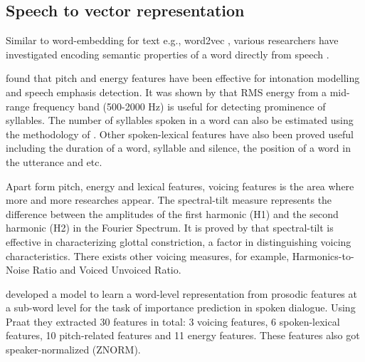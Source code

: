\subsection{Speech to vector representation}
Similar to word-embedding for text e.g., word2vec \citep{Mikolov2013}, various researchers have investigated encoding semantic properties of a word directly from speech \citep{Chung2018}. 

\citet{Brenier2005} found that pitch and energy features have been effective for intonation modelling and speech emphasis detection. It was shown by \citet{Tamburini2003} that RMS energy from a mid-range frequency band (500-2000 Hz) is useful for detecting prominence of syllables. The number of syllables spoken in a word can also be estimated using the methodology of \citet{DeJong2009}. Other spoken-lexical features have also been proved useful including the duration of a word, syllable and silence, the position of a word in the utterance and etc. 

Apart form pitch, energy and lexical features, voicing features is the area where more and more researches appear. The spectral-tilt measure represents the difference between the amplitudes of the first harmonic (H1) and the second harmonic (H2) in the Fourier Spectrum. It is proved by \citet{Keating2006} that spectral-tilt is effective in characterizing glottal constriction, a factor in distinguishing voicing characteristics. There exists other voicing measures, for example, Harmonics-to-Noise Ratio and Voiced Unvoiced Ratio.

\citet{Kafle2019} developed a model to learn a word-level representation from prosodic features at a sub-word level for the task of importance prediction in spoken dialogue. Using Praat they extracted 30 features in total: 3 voicing features, 6 spoken-lexical features, 10 pitch-related features and 11 energy features. These features also got speaker-normalized (ZNORM).



